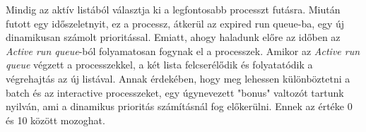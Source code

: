 
Mindig az aktív listából választja ki a legfontosabb processzt futásra. Miután futott egy időszeletnyit, ez a processz, átkerül az expired run queue-ba, egy új dinamikusan számolt prioritással.
Emiatt, ahogy haladunk előre az időben az \textit{Active run queue}-ból folyamatosan fogynak el a processzek.  Amikor az \textit{Active run queue} végzett a processzekkel, a két lista felcserélődik és folyatatódik a végrehajtás az új listával.
Annak érdekében, hogy meg lehessen különböztetni a batch és az interactive processzeket, egy úgynevezett "bonus" valtozót tartunk nyilván, ami a dinamikus prioritás számításnál fog előkerülni. Ennek az értéke 0 és 10 között mozoghat.


